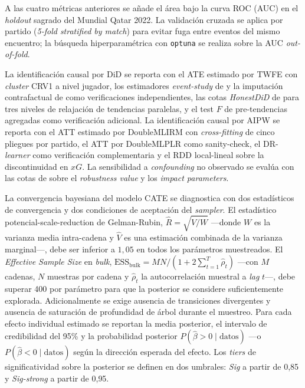 A las cuatro métricas anteriores se añade el área bajo la curva ROC
(AUC) en el \textit{holdout} sagrado del Mundial Qatar 2022. La
validación cruzada se aplica por partido (\textit{5-fold stratified
by match}) para evitar fuga entre eventos del mismo encuentro; la
búsqueda hiperparamétrica con \texttt{optuna} se realiza sobre la AUC
\textit{out-of-fold}.

La identificación causal por DiD se reporta con el ATE estimado por
TWFE con \textit{cluster} CRV1 a nivel jugador, los estimadores
\textit{event-study} de \citeauthor{SunAbraham2021} y la imputación
contrafactual de \citeauthor{BorusyakJaravelSpiess2024} como
verificaciones independientes, las cotas \textit{HonestDiD} de
\citeauthor{RambachanRoth2023} para tres niveles de relajación de
tendencias paralelas, y el test $F$ de pre-tendencias agregadas
\parencite{Roth2022Pretest} como verificación adicional. La identificación causal
por AIPW se reporta con el ATT estimado por DoubleMLIRM con
\textit{cross-fitting} de cinco pliegues por partido, el ATT por
DoubleMLPLR como sanity-check, el DR-\textit{learner} como
verificación complementaria y el RDD local-lineal sobre la
discontinuidad en $xG$. La sensibilidad a \textit{confounding} no
observado se evalúa con las cotas de \textcite{CinelliHazlett2020} sobre
el \textit{robustness value} y los \textit{impact parameters}.

La convergencia bayesiana del modelo CATE se diagnostica con dos
estadísticos de convergencia y dos condiciones de aceptación del
\textit{sampler}. El estadístico potencial-scale-reduction
de Gelman-Rubin, $\hat{R} = \sqrt{\hat{V}/W}$ ---donde $W$ es la
varianza media intra-cadena y $\hat{V}$ es una estimación combinada
de la varianza marginal---, debe ser inferior a $1{,}05$ en todos los
parámetros muestreados. El \textit{Effective Sample Size} en
\textit{bulk}, $\text{ESS}_{\text{bulk}} = MN / (1 + 2 \sum_{t=1}^{T}
\hat{\rho}_t)$ ---con $M$ cadenas, $N$ muestras por cadena y
$\hat{\rho}_t$ la autocorrelación muestral a \textit{lag} $t$---,
debe superar 400 por parámetro para que la posterior se considere
suficientemente explorada. Adicionalmente se exige ausencia de
transiciones divergentes y ausencia de saturación de profundidad de
árbol durante el muestreo. Para cada efecto individual estimado se reportan
la media posterior, el intervalo de credibilidad del 95\% y la
probabilidad posterior $P(\hat{\beta} > 0 \mid \text{datos})$ ---o
$P(\hat{\beta} < 0 \mid \text{datos})$ según la dirección esperada
del efecto. Los \textit{tiers} de significatividad sobre la posterior
se definen en dos umbrales: \textit{Sig} a partir de 0{,}85 y
\textit{Sig-strong} a partir de 0{,}95.

